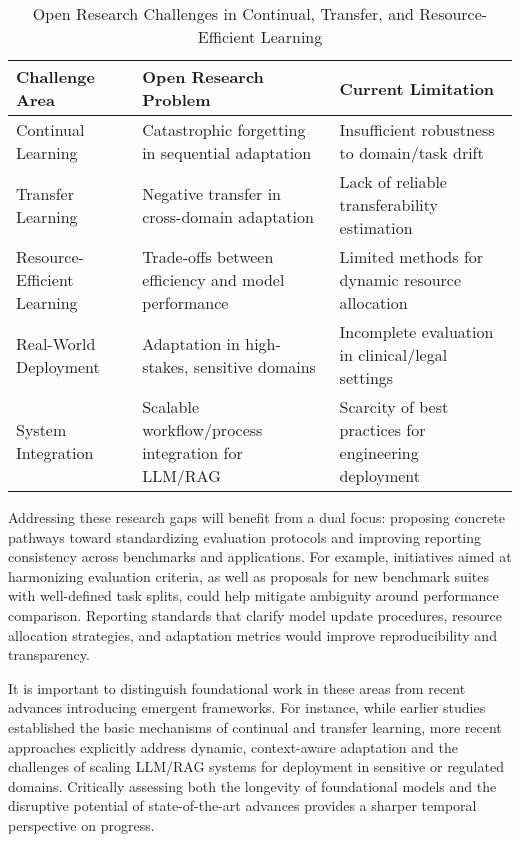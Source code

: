 \documentclass[sigconf]{acmart}
\begin{document}
\begin{table*}[htbp]
\centering
\caption{Open Research Challenges in Continual, Transfer, and Resource-Efficient Learning}
\label{tab:openproblems}
\begin{adjustbox}{max width=\textwidth}
\begin{tabular}{@{}lll@{}}
\toprule
Challenge Area & Open Research Problem & Current Limitation \\ 
\midrule
Continual Learning & Catastrophic forgetting in sequential adaptation & Insufficient robustness to domain/task drift \\
Transfer Learning & Negative transfer in cross-domain adaptation & Lack of reliable transferability estimation \\
Resource-Efficient Learning & Trade-offs between efficiency and model performance & Limited methods for dynamic resource allocation \\
Real-World Deployment & Adaptation in high-stakes, sensitive domains & Incomplete evaluation in clinical/legal settings \\
System Integration & Scalable workflow/process integration for LLM/RAG & Scarcity of best practices for engineering deployment \\
\bottomrule
\end{tabular}
\end{adjustbox}
\end{table*}

Addressing these research gaps will benefit from a dual focus: proposing concrete pathways toward standardizing evaluation protocols and improving reporting consistency across benchmarks and applications. For example, initiatives aimed at harmonizing evaluation criteria, as well as proposals for new benchmark suites with well-defined task splits, could help mitigate ambiguity around performance comparison. Reporting standards that clarify model update procedures, resource allocation strategies, and adaptation metrics would improve reproducibility and transparency.

It is important to distinguish foundational work in these areas from recent advances introducing emergent frameworks. For instance, while earlier studies established the basic mechanisms of continual and transfer learning, more recent approaches explicitly address dynamic, context-aware adaptation and the challenges of scaling LLM/RAG systems for deployment in sensitive or regulated domains. Critically assessing both the longevity of foundational models and the disruptive potential of state-of-the-art advances provides a sharper temporal perspective on progress.
\end{document}
